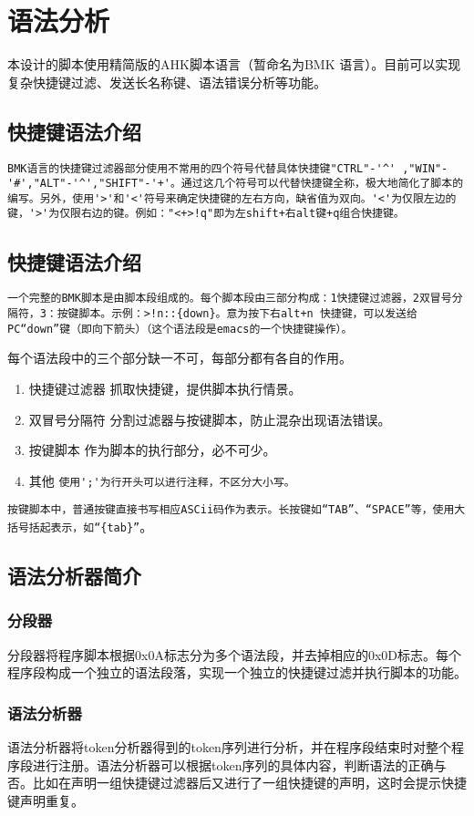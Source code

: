 \section{语法分析}
本设计的脚本使用精简版的AHK脚本语言（暂命名为BMK 语言）。目前可以实现复杂快捷键过滤、发送长名称键、语法错误分析等功能。
\subsection{快捷键语法介绍}
\verb|BMK语言的快捷键过滤器部分使用不常用的四个符号代替具体快捷键"CTRL"-'^' ,"WIN"-'#',"ALT"-'^',"SHIFT"-'+'。通过这几个符号可以代替快捷键全称，极大地简化了脚本的编写。另外，使用'>'和'<'符号来确定快捷键的左右方向，缺省值为双向。'<'为仅限左边的键，'>'为仅限右边的键。例如："<+>!q"即为左shift+右alt键+q组合快捷键。|

\subsection{快捷键语法介绍}
\verb|一个完整的BMK脚本是由脚本段组成的。每个脚本段由三部分构成：1快捷键过滤器，2双冒号分隔符，3：按键脚本。示例：>!n::{down}。意为按下右alt+n 快捷键，可以发送给PC“down”键（即向下箭头）（这个语法段是emacs的一个快捷键操作）。|

每个语法段中的三个部分缺一不可，每部分都有各自的作用。
\begin{enumerate}
\item 快捷键过滤器
抓取快捷键，提供脚本执行情景。

\item 双冒号分隔符
分割过滤器与按键脚本，防止混杂出现语法错误。

\item 按键脚本
作为脚本的执行部分，必不可少。

\item 其他
\verb|使用';'为行开头可以进行注释，不区分大小写。|
\end{enumerate}
\verb|按键脚本中，普通按键直接书写相应ASCii码作为表示。长按键如“TAB”、“SPACE”等，使用大括号括起表示，如“{tab}”|。
\subsection{语法分析器简介}
\subsubsection{分段器}
分段器将程序脚本根据0x0A标志分为多个语法段，并去掉相应的0x0D标志。每个程序段构成一个独立的语法段落，实现一个独立的快捷键过滤并执行脚本的功能。
\subsubsection{语法分析器}
语法分析器将token分析器得到的token序列进行分析，并在程序段结束时对整个程序段进行注册。语法分析器可以根据token序列的具体内容，判断语法的正确与否。比如在声明一组快捷键过滤器后又进行了一组快捷键的声明，这时会提示快捷键声明重复。
